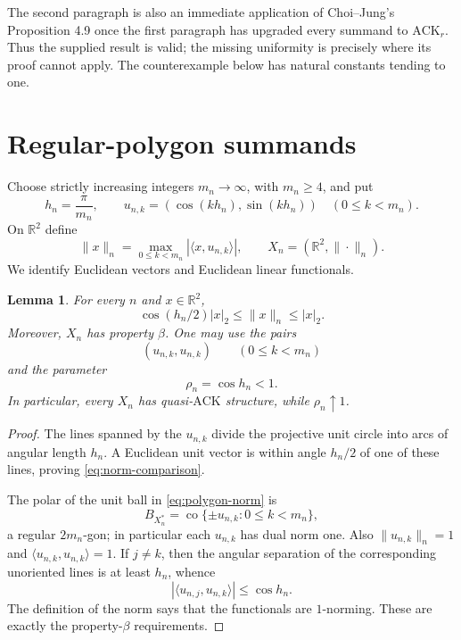 \documentclass[11pt]{article}
\newtheorem{lemma}[theorem]{Lemma}
\theoremstyle{definition}
\newcommand{\R}{\mathbb R}
\newcommand{\ACK}{\mathrm{ACK}}
\newcommand{\ip}[2]{\langle #1,#2\rangle}
\begin{document}
The second paragraph is also an immediate application of
Choi--Jung's Proposition 4.9 once the first paragraph has upgraded every
summand to $\ACK_r$.  Thus the supplied result is valid; the missing
uniformity is precisely where its proof cannot apply.  The counterexample
below has natural constants tending to one.

\section{Regular-polygon summands}

Choose strictly increasing integers $m_n\to\infty$, with $m_n\ge4$, and put
\[
  h_n=\frac{\pi}{m_n},\qquad
  u_{n,k}=(\cos(kh_n),\sin(kh_n))
  \quad(0\le k<m_n).
\]
On $\R^2$ define
\begin{equation}\label{eq:polygon-norm}
  \|x\|_n=\max_{0\le k<m_n}|\ip{x}{u_{n,k}}|,
  \qquad X_n=(\R^2,\|\cdot\|_n).
\end{equation}
We identify Euclidean vectors and Euclidean linear functionals.

\begin{lemma}\label{lem:polygon}
For every $n$ and $x\in\R^2$,
\begin{equation}\label{eq:norm-comparison}
  \cos(h_n/2)|x|_2\le\|x\|_n\le |x|_2.
\end{equation}
Moreover, $X_n$ has property $\beta$.  One may use the pairs
\[
 (u_{n,k},u_{n,k})\qquad(0\le k<m_n)
\]
and the parameter
\[
  \rho_n=\cos h_n<1.
\]
In particular, every $X_n$ has quasi-$\ACK$ structure, while
$\rho_n\uparrow1$.
\end{lemma}

\begin{proof}
The lines spanned by the $u_{n,k}$ divide the projective unit circle into
arcs of angular length $h_n$.  A Euclidean unit vector is within angle
$h_n/2$ of one of these lines, proving \eqref{eq:norm-comparison}.

The polar of the unit ball in \eqref{eq:polygon-norm} is
\[
  B_{X_n^*}=\operatorname{co}\{\pm u_{n,k}:0\le k<m_n\},
\]
a regular $2m_n$-gon; in particular each $u_{n,k}$ has dual norm one.
Also $\|u_{n,k}\|_n=1$ and
$\ip{u_{n,k}}{u_{n,k}}=1$.  If $j\ne k$, then the angular separation of
the corresponding unoriented lines is at least $h_n$, whence
\[
 |\ip{u_{n,j}}{u_{n,k}}|\le\cos h_n.
\]
The definition of the norm says that the functionals are $1$-norming.
These are exactly the property-$\beta$ requirements.
\end{proof}
\end{document}
